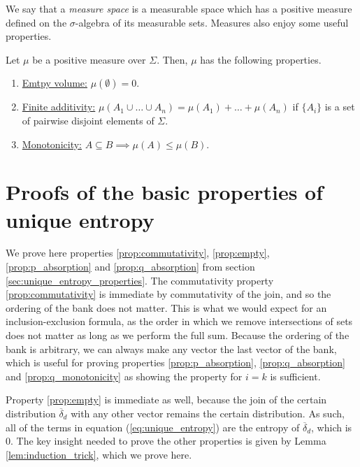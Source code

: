 We say that a \textit{measure space} is a measurable space which has a positive measure defined on the $\sigma$-algebra of its measurable sets. Measures also enjoy some useful properties.

\begin{appendix_theorem}
    Let $\mu$ be a positive measure over $\Sigma$. Then, $\mu$ has the following properties.
    \begin{enumerate}
        \item \underline{Emtpy volume:} $\mu(\emptyset) = 0$.
        \item \underline{Finite additivity:} $\mu(A_1 \cup \dots \cup A_n) = \mu(A_1) + \dots + \mu(A_n)$ if $\{A_i\}$ is a set of pairwise disjoint elements of $\Sigma$.
        \item \underline{Monotonicity:} $A \subseteq B \implies \mu(A) \leq \mu(B)$.
    \end{enumerate}
\end{appendix_theorem}



\newpage

\section{Proofs of the basic properties of unique entropy} \label{app:unique_entropy_properties}

\setcounter{equation}{0}

We prove here properties \ref{prop:commutativity}, \ref{prop:empty}, \ref{prop:p_absorption} and \ref{prop:q_absorption} from section \ref{sec:unique_entropy_properties}. The commutativity property \ref{prop:commutativity} is immediate by commutativity of the join, and so the ordering of the bank does not matter. This is what we would expect for an inclusion-exclusion formula, as the order in which we remove intersections of sets does not matter as long as we perform the full sum. Because the ordering of the bank is arbitrary, we can always make any vector the last vector of the bank, which is useful for proving properties \ref{prop:p_absorption}, \ref{prop:q_absorption} and \ref{prop:q_monotonicity} as showing the property for $i = k$ is sufficient.

Property \ref{prop:empty} is immediate as well, because the join of the certain distribution $\overline{\delta}_d$ with any other vector remains the certain distribution. As such, all of the terms in equation (\ref{eq:unique_entropy}) are the entropy of $\overline{\delta}_d$, which is 0.  The key insight needed to prove the other properties is given by Lemma \ref{lem:induction_trick}, which we prove here.

